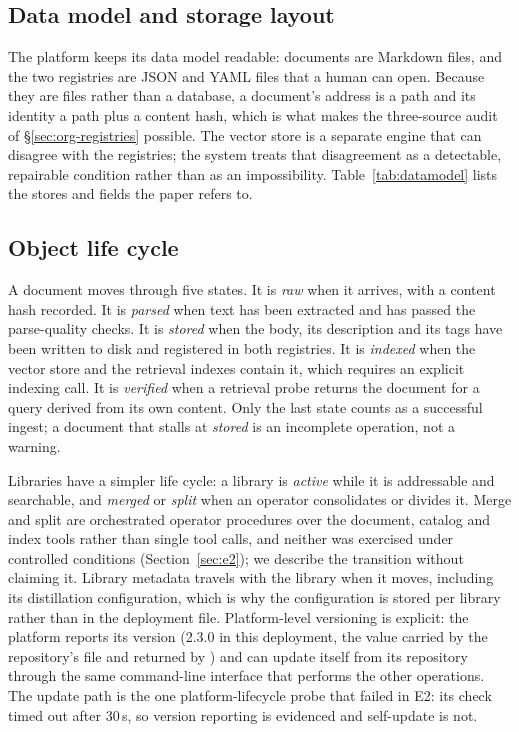 \subsection{Data model and storage layout}
\label{sec:datamodel}

The platform keeps its data model readable: documents are
Markdown files, and the two registries are JSON and YAML files that a human
can open. Because they are files rather than a database, a document's address is a path and its identity a path plus a content hash, which is what makes
the three-source audit of \S\ref{sec:org-registries} possible. The vector
store is a separate engine that can disagree with the registries; the system
treats that disagreement as a detectable, repairable condition rather than as
an impossibility. Table~\ref{tab:datamodel} lists the stores and fields the
paper refers to.



\subsection{Object life cycle}
\label{sec:lifecycle}

A document moves through five states. It is \emph{raw} when it arrives, with
a content hash recorded. It is \emph{parsed} when text has been extracted and
has passed the parse-quality checks. It is \emph{stored} when the body, its
description and its tags have been written to disk and registered in both
registries. It is \emph{indexed} when the vector store and the retrieval
indexes contain it, which requires an explicit indexing call. It is
\emph{verified} when a retrieval probe returns the document for a query
derived from its own content. Only the last state counts as a successful
ingest; a document that stalls at \emph{stored} is an incomplete operation,
not a warning.

Libraries have a simpler life cycle: a library is \emph{active} while it is
addressable and searchable, and \emph{merged} or \emph{split} when an
operator consolidates or divides it. Merge and split are orchestrated
operator procedures over the document, catalog and index tools rather than
single tool calls, and neither was exercised under controlled conditions
(Section~\ref{sec:e2}); we describe the transition without claiming it.
Library metadata travels with the
library when it moves, including its distillation configuration, which is why
the configuration is stored per library rather than in the deployment file.
Platform-level versioning is explicit: the platform reports its version
(2.3.0 in this deployment, the value carried by the repository's
\protect{} file and returned by
\protect{}) and can update itself from its
repository through
the same command-line interface that performs the other operations. The
update path is the one platform-lifecycle probe that failed in E2: its check
timed out after 30\,s, so version reporting is evidenced and self-update is
not.

